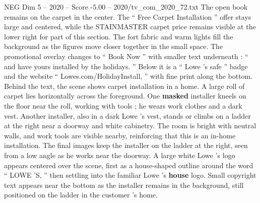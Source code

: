 \begin{textsample}{NEG Dim 5 – 2020 – Score -5.00 – 2020/tv\_com\_2020\_72.txt}
The open book remains on the carpet in the center.
The “ Free Carpet Installation ” offer stays large and centered, while the STAINMASTER carpet price remains visible at the lower right for part of this section.
The fort fabric and warm lights fill the background as the figures move closer together in the small space.
The promotional overlay changes to “ Book Now ” with smaller text underneath : “ and have yours installed by the holidays. ” Below it is a “ Lowe ’s safe ” badge and the website “ Lowes.com/HolidayInstall, ” with fine print along the bottom.
Behind the text, the scene shows carpet installation in a home.
A large roll of carpet lies horizontally across the foreground.
One \textbf{masked} installer kneels on the floor near the roll, working with tools ; he wears work clothes and a dark vest.
Another installer, also in a dark Lowe ’s vest, stands or climbs on a ladder at the right near a doorway and white cabinetry.
The room is bright with neutral walls, and work tools are visible nearby, reinforcing that this is an in-home installation.
The final images keep the installer on the ladder at the right, seen from a low angle as he works near the doorway.
A large white Lowe ’s logo appears centered over the scene, first as a house-shaped outline around the word “ LOWE ’S, ” then settling into the familiar Lowe ’s \textbf{house} logo.
Small copyright text appears near the bottom as the installer remains in the background, still positioned on the ladder in the customer ’s home.

\end{textsample}
